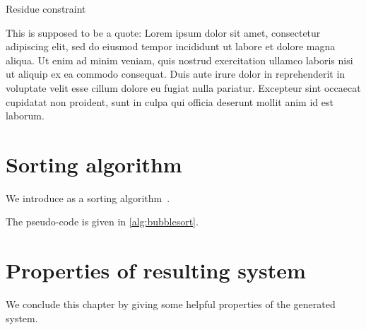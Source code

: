 \begin{theorem}
    \testMath
\end{theorem}
\begin{lemma}
    \testMath
\end{lemma}
\begin{corollary}
    \testMath
\end{corollary}
\begin{proposition}
    \testMath
\end{proposition}
\begin{definition}
    \testMath
\end{definition}
\begin{example}
    \testMath
\end{example}
\begin{remark}
    \testMath
\end{remark}
\begin{problem}
    \testMath
\end{problem}
\begin{constraint}{Residue constraint}
    \testMath
\end{constraint}


\begin{displayquote}
    This is supposed to be a quote:
    Lorem ipsum dolor sit amet, consectetur adipiscing elit, sed do eiusmod tempor incididunt ut labore et dolore magna aliqua. Ut enim ad minim veniam, quis nostrud exercitation ullamco laboris nisi ut aliquip ex ea commodo consequat. Duis aute irure dolor in reprehenderit in voluptate velit esse cillum dolore eu fugiat nulla pariatur. Excepteur sint occaecat cupidatat non proident, sunt in culpa qui officia deserunt mollit anim id est laborum.
\end{displayquote}



\section{Sorting algorithm}
We introduce  as a sorting algorithm~\cite{DBLP:books/lib/Knuth97}.

The pseudo-code is given in \cref{alg:bubblesort}. 


\section{Properties of resulting system}
\label{sec:first_chapter_properties}
We conclude this chapter by giving some helpful properties of the generated system.

